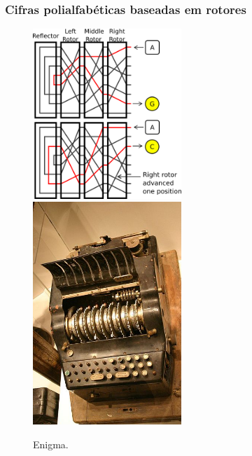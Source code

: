 \begin{frame}
\frametitle{Cifras polialfabéticas baseadas em rotores}
\scriptsize
\begin{figure}[h]
\centering
\includegraphics[width=0.5\textwidth,height=0.5\textheight,keepaspectratio]{figures/enigmaaction.png}
\includegraphics[width=0.5\textwidth,height=0.5\textheight,keepaspectratio]{figures/enigma.jpg}
\caption{Enigma.}
\label{fig-enigma}
\end{figure}
\vspace{-3ex}
\end{frame}



